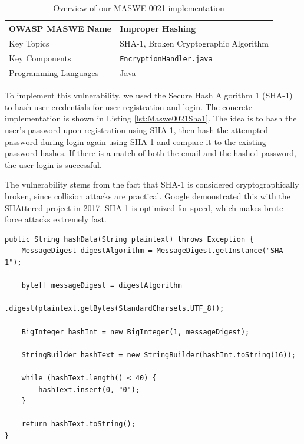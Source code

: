 \begin{table}[H]
\centering
\renewcommand{\arraystretch}{1.3}
\begin{tabular}{p{5cm} p{8cm}} 
\toprule
OWASP MASWE Name & Improper Hashing \\ 
\midrule
Key Topics & SHA-1, Broken Cryptographic Algorithm \\
Key Components & \texttt{EncryptionHandler.java} \\
Programming Languages & Java \\ 
\bottomrule
\end{tabular}
\caption{Overview of our MASWE-0021 implementation}
\label{tab:maswe-0021}
\end{table}

To implement this vulnerability, we used the Secure Hash Algorithm 1 (SHA-1) to hash user credentials for user registration and login. The concrete implementation is shown in Listing \ref{lst:Maswe0021Sha1}. The idea is to hash the user's password upon registration using SHA-1, then hash the attempted password during login again using SHA-1 and compare it to the existing password hashes. If there is a match of both the email and the hashed password, the user login is successful.

The vulnerability stems from the fact that SHA-1 is considered cryptographically broken, since collision attacks are practical. Google demonstrated this with the SHAttered project \cite{google-shattered} in 2017. SHA-1 is optimized for speed, which makes brute-force attacks extremely fast.

\begin{lstlisting}[style=JavaStyle, float=tbh, captionpos=b, caption={SHA-1 hashing for user credentials}, label={lst:Maswe0021Sha1}]
 public String hashData(String plaintext) throws Exception {
    MessageDigest digestAlgorithm = MessageDigest.getInstance("SHA-1");

    byte[] messageDigest = digestAlgorithm
                                .digest(plaintext.getBytes(StandardCharsets.UTF_8));

    BigInteger hashInt = new BigInteger(1, messageDigest);

    StringBuilder hashText = new StringBuilder(hashInt.toString(16));

    while (hashText.length() < 40) {
        hashText.insert(0, "0");
    }

    return hashText.toString();
}
\end{lstlisting}


